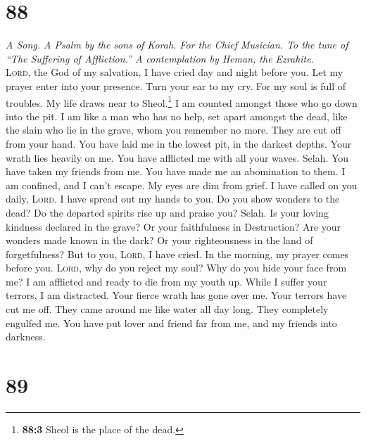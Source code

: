 \hypertarget{section-87}{%
\section{88}\label{section-87}}

\emph{A Song. A Psalm by the sons of Korah. For the Chief Musician. To
the tune of ``The Suffering of Affliction.'' A contemplation by Heman,
the Ezrahite.}\\
 \textsc{Lord}, the God of my salvation, I have cried day
and night before you.  Let my prayer enter into your
presence. Turn your ear to my cry.  For my soul is full of
troubles. My life draws near to Sheol.\footnote{\textbf{88:3} Sheol is
  the place of the dead.}  I am counted amongst those who
go down into the pit. I am like a man who has no help, 
set apart amongst the dead, like the slain who lie in the grave, whom
you remember no more. They are cut off from your hand. 
You have laid me in the lowest pit, in the darkest depths.
 Your wrath lies heavily on me. You have afflicted me with
all your waves. Selah.  You have taken my friends from me.
You have made me an abomination to them. I am confined, and I can't
escape.  My eyes are dim from grief. I have called on you
daily, \textsc{Lord}. I have spread out my hands to you. 
Do you show wonders to the dead? Do the departed spirits rise up and
praise you? Selah.  Is your loving kindness declared in
the grave? Or your faithfulness in Destruction?  Are your
wonders made known in the dark? Or your righteousness in the land of
forgetfulness?  But to you, \textsc{Lord}, I have cried.
In the morning, my prayer comes before you. 
\textsc{Lord}, why do you reject my soul? Why do you hide your face from
me?  I am afflicted and ready to die from my youth up.
While I suffer your terrors, I am distracted.  Your
fierce wrath has gone over me. Your terrors have cut me off.
 They came around me like water all day long. They
completely engulfed me.  You have put lover and friend
far from me, and my friends into darkness.

\hypertarget{section-88}{%
\section{89}\label{section-88}}


